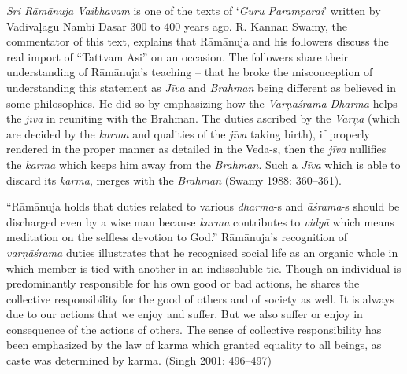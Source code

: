 \textit{Sri Rāmānuja Vaibhavam} is one of the texts of ‘\textit{Guru Paramparai}’ written by Vadivaḷagu Nambi Dasar 300 to 400 years ago. R. Kannan Swamy, the commentator of this text, explains that Rāmānuja and his followers discuss the real import of “Tattvam Asi” on an occasion. The followers share their understanding of Rāmānuja’s teaching – that he broke the misconception of understanding this statement as \textit{Jīva} and \textit{Brahman} being different as believed in some philosophies. He did so by emphasizing how the \textit{Varņāśrama Dharma} helps the \textit{jīva }in reuniting with the Brahman. The duties ascribed by the \textit{Varņa} (which are decided by the \textit{karma }and qualities of the \textit{jīva} taking birth), if properly rendered in the proper manner as detailed in the Veda-s, then the \textit{jīva} nullifies the \textit{karma} which keeps him away from the \textit{Brahman}. Such a \textit{Jīva} which is able to discard its \textit{karma}, merges with the \textit{Brahman} (Swamy 1988: 360–361).

“Rāmānuja holds that duties related to various \textit{dharma}-s and \textit{āśrama}-s should be discharged even by a wise man because \textit{karma} contributes to \textit{vidyā} which means meditation on the selfless devotion to God.” Rāmānuja’s recognition of \textit{varņāśrama} duties illustrates that he recognised social life as an organic whole in which member is tied with another in an indissoluble tie. Though an individual is predominantly responsible for his own good or bad actions, he shares the collective responsibility for the good of others and of society as well. It is always due to our actions that we enjoy and suffer. But we also suffer or enjoy in consequence of the actions of others. The sense of collective responsibility has been emphasized by the law of karma which granted equality to all beings, as caste was determined by karma. (Singh 2001: 496–497)

